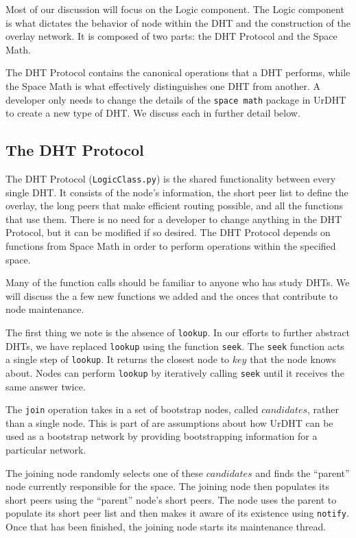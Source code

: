 \documentclass[11pt,conference]{IEEEtran}
\begin{document}
Most of our discussion will focus on the Logic component.
The Logic component is what dictates the behavior of node within the DHT and the construction of the overlay network.
It is composed of two parts: the DHT Protocol and the Space Math.

The DHT Protocol contains the canonical operations that a DHT performs, while the Space Math is what effectively distinguishes one DHT from another.
A developer only needs to change the details of the \texttt{space math} package in UrDHT to create a new type of DHT.
We discuss each in further detail below.

\subsection{The DHT Protocol }
\label{sec:protocol}

The DHT Protocol (\texttt{LogicClass.py}) \cite{urdht} is the shared functionality between every single DHT.
It consists of the node's information, the short peer list to define the overlay, the long peers that make efficient routing possible, and all the functions that use them.
There is no need for a developer to change anything in the DHT Protocol, but it can be modified if so desired.
The DHT Protocol depends on functions from Space Math in order to perform operations within the specified space.


Many of the function calls should be familiar to anyone who has study DHTs.
We will discuss the a few new functions we added and the onces that contribute to node maintenance.

The first thing we note is the absence of \texttt{lookup}.
In our efforts to further abstract DHTs, we have replaced \texttt{lookup} using the function \texttt{seek}.
The \texttt{seek} function acts a single step of \texttt{lookup}.
It returns the closest node to $ key $ that the node knows about.
Nodes can perform \texttt{lookup} by iteratively calling \texttt{seek} until it receives the same answer twice.


The \texttt{join} operation takes in a set of bootstrap nodes, called $ candidates $, rather than a single node.
This is part of are assumptions about how UrDHT can be used as a bootstrap network by providing bootstrapping information for a particular network.

The joining node randomly selects one of these $ candidates $ and finds the ``parent'' node currently responsible for the space.
The joining node then populates its short peers using the ``parent'' node's short peers.
The node  uses the parent to populate its short peer list and then makes it aware of its existence using \texttt{notify}.
Once that has been finished, the joining node starts its maintenance thread.
\end{document}
